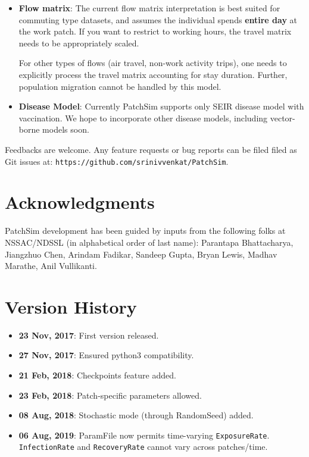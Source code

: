 \documentclass[10pt]{scrartcl}
\theoremstyle{definition}
\begin{document}
\begin{itemize}
	\item \textbf{Flow matrix}: The current flow matrix interpretation is best 
	suited for commuting type datasets, and assumes the individual spends 
	\textbf{entire day} at the work patch. If you want to restrict to working 
	hours, the travel matrix needs to be appropriately scaled.
	
	For other types of flows (air travel, non-work activity trips), one needs 
	to explicitly process the travel matrix accounting for stay duration. 
	Further, population migration cannot be handled by this model. 

	\item \textbf{Disease Model}: Currently PatchSim supports only SEIR disease 
	model with vaccination. We hope to incorporate other disease models, 
	including vector-borne models soon.
	
\end{itemize}

Feedbacks are welcome. Any feature requests or bug reports can be filed filed as Git issues at: 
\verb|https://github.com/srinivvenkat/PatchSim|.

\section{Acknowledgments}
PatchSim development has been guided by inputs from the following folks at NSSAC/NDSSL (in alphabetical order of last name): 
Parantapa Bhattacharya, Jiangzhuo Chen, Arindam Fadikar, Sandeep Gupta, Bryan Lewis, Madhav Marathe, Anil Vullikanti.

\section*{Version History}
\begin{itemize}
	\item \textbf{23 Nov, 2017}: First version released.
	\item \textbf{27 Nov, 2017}: Ensured python3 compatibility.
	\item \textbf{21 Feb, 2018}: Checkpoints feature added.
	\item \textbf{23 Feb, 2018}: Patch-specific parameters allowed. 
	\item \textbf{08 Aug, 2018}: Stochastic mode (through RandomSeed) added.
	\item \textbf{06 Aug, 2019}: ParamFile now permits time-varying \verb|ExposureRate|. \verb|InfectionRate| and \verb|RecoveryRate| 
	cannot vary across patches/time. 
\end{itemize}
\end{document}
